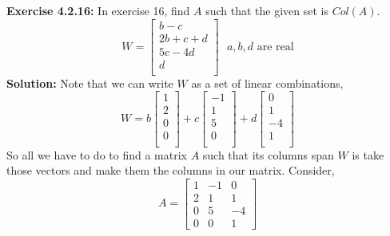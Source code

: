 \documentclass{amsart}
\begin{document}
\noindent\textbf{Exercise 4.2.16: } In exercise 16, find $A$ such that the given set is $Col(A)$.\\
\begin{equation*}
W=
\begin{bmatrix}
b-c\\
2b+c+d\\
5c-4d\\
d\\
\end{bmatrix}
\text{ $a,b,d$ are real}
\end{equation*}
\noindent \textbf{Solution: } Note that we can write $W$ as a set of linear combinations,
\begin{equation*}
W=
b
\begin{bmatrix}
1\\
2\\
0\\
0\\
\end{bmatrix}
+
c
\begin{bmatrix}
-1\\
1\\
5\\
0\\
\end{bmatrix}
+
d
\begin{bmatrix}
0\\
1\\
-4\\
1\\
\end{bmatrix}
\end{equation*}
So all we have to do to find a matrix $A$ such that its columns span $W$ is take those vectors and make them the columns in our matrix. Consider,
\begin{equation*}
A=
\begin{bmatrix}
1&-1&0\\
2&1&1\\
0&5&-4\\
0&0&1
\end{bmatrix}
\end{equation*}
\vspace{1in}
\end{document}
